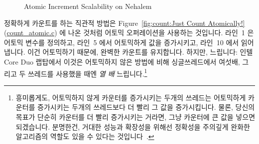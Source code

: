 \begin{figure}[tb]
\begin{center}
\end{center}
\caption{Atomic Increment Scalability on Nehalem}
\label{fig:count:Atomic Increment Scalability on Nehalem}
\end{figure}

정확하게 카운트를 하는 직관적 방법은
Figure~\ref{fig:count:Just Count Atomically!} (\url{count_atomic.c})
에 나온 것처럼 어토믹 오퍼레이션을 사용하는 것입니다.
라인~1 은 어토믹 변수를 정의하고, 라인~5 에서 어토믹하게 값을 증가시키고,
라인~10 에서 읽어냅니다.
이건 어토믹하기 때문에, 완벽한 카운트를 유지합니다.
하지만, 느립니다: 인텔 Core Duo 랩탑에서 이것은 어토믹하지 않은 방법에 비해
싱글쓰레드에서 여섯배, 그리고 두 쓰레드를 사용했을 때엔 \emph{열 배}
느립니다.\footnote{
	흥미롭게도, 어토믹하지 않게 카운터를 증가시키는 두개의 쓰레드는
	어토믹하게 카운터를 증가시키는 두개의 쓰레드보다 더 빨리 그 값을
	증가시킵니다.
	물론, 당신의 목표가 단순히 카운터를 더 빨리 증가시키는 거라면, 그냥
	카운터에 큰 값을 넣으면 되겠습니다.
	분명한건, 거대한 성능과 확장성을 위해선 정확성을 주의깊게 완화한
	알고리즘의 역할도 있을 수 있다는
	것입니다~\cite{Andrews91textbook,Arcangeli03,DavidUngar2011unsync}.}
\iffalse

